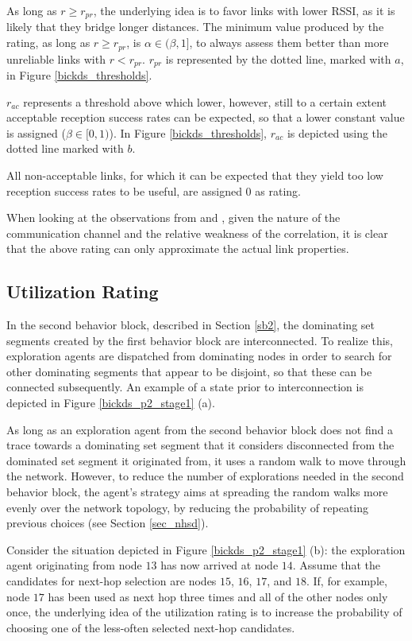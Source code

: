 As long as $r \geq r_{pr}$, the underlying idea is to favor links with lower RSSI, as it is likely that they bridge longer distances. The minimum value produced by the rating, as long as $r \geq r_{pr}$, is $\alpha \in (\beta,1]$, to always assess them better than more unreliable links with $r < r_{pr}$. $r_{pr}$ is represented by the dotted line, marked with $a$, in Figure \ref{bickds_thresholds}. 

$r_{ac}$ represents a threshold above which lower, however, still to a certain extent acceptable reception success rates can be expected, so that a lower constant value is assigned ($\beta \in [0,1)$). In Figure \ref{bickds_thresholds}, $r_{ac}$ is depicted using the dotted line marked with $b$. 

All non-acceptable links, for which it can be expected that they yield too low reception success rates to be useful, are assigned $0$ as rating.




When looking at the observations from \cite{woo03} and \cite{zhao03performance}, given the nature of the communication channel and the relative weakness of the correlation, it is clear that the above rating can only approximate the actual link properties. 

\subsection{Utilization Rating}\label{sec_ur}


In the second behavior block, described in Section \ref{sb2}, the dominating set segments created by the first behavior block are interconnected. To realize this, exploration agents are dispatched from dominating nodes in order to search for other dominating segments that appear to be disjoint, so that these can be connected subsequently. An example of a state prior to interconnection is depicted in Figure \ref{bickds_p2_stage1} (a).

As long as an exploration agent from the second behavior block does not find a trace towards a dominating set segment that it considers disconnected from the dominated set segment it originated from, it uses a random walk to move through the network. However, to reduce the number of explorations needed in the second behavior block, the agent's strategy aims at spreading the random walks more evenly over the network topology, by reducing the probability of repeating previous choices (see Section \ref{sec_nhsd}). 

Consider the situation depicted in Figure \ref{bickds_p2_stage1} (b): the exploration agent originating from node $13$ has now arrived at node $14$. Assume that the candidates for next-hop selection are nodes $15$, $16$, $17$, and $18$. If, for example, node $17$ has been used as next hop three times and all of the other nodes only once, the underlying idea of the utilization rating is to increase the probability of choosing one of the less-often selected next-hop candidates. 

